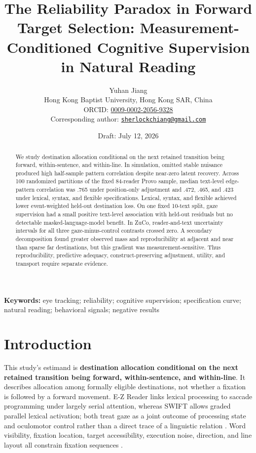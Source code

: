 \documentclass[11pt]{article}
\title{The Reliability Paradox in Forward Target Selection: Measurement-Conditioned Cognitive Supervision in Natural Reading}
\author{Yuhan Jiang\\
\small Hong Kong Baptist University, Hong Kong SAR, China\\
\small ORCID: \href{https://orcid.org/0009-0002-2056-9328}{0009-0002-2056-9328}\\
\small Corresponding author: \href{mailto:sherlockchiang@gmail.com}{\texttt{sherlockchiang@gmail.com}}}
\date{Draft: July 12, 2026}
\begin{document}
\maketitle
\begin{abstract}
We study destination allocation conditional on the next retained transition being forward, within-sentence, and within-line. In simulation, omitted stable nuisance produced high half-sample pattern correlation despite near-zero latent recovery. Across 100 randomized partitions of the fixed 84-reader Provo sample, median text-level edge-pattern correlation was .765 under position-only adjustment and .472, .465, and .423 under lexical, syntax, and flexible specifications. Lexical, syntax, and flexible achieved lower event-weighted held-out destination loss. On one fixed 10-text split, gaze supervision had a small positive text-level association with held-out residuals but no detectable masked-language-model benefit. In ZuCo, reader-and-text uncertainty intervals for all three gaze-minus-control contrasts crossed zero. A secondary decomposition found greater observed mass and reproducibility at adjacent and near than sparse far destinations, but this gradient was measurement-sensitive. Thus reproducibility, predictive adequacy, construct-preserving adjustment, utility, and transport require separate evidence.
\end{abstract}
\noindent\textbf{Keywords:} eye tracking; reliability; cognitive supervision; specification curve; natural reading; behavioral signals; negative results


\section{Introduction}

This study's estimand is \textbf{destination allocation conditional on the next retained transition being forward, within-sentence, and within-line}. It describes allocation among formally eligible destinations, not whether a fixation is followed by a forward movement. E-Z Reader links lexical processing to saccade programming under largely serial attention, whereas SWIFT allows graded parallel lexical activation; both treat gaze as a joint outcome of processing state and oculomotor control rather than a direct trace of a linguistic relation \citep{reichle1998,reichle2003,engbert2005}. Word visibility, fixation location, target accessibility, execution noise, direction, and line layout all constrain fixation sequences \citep{rayner1998}.
\end{document}
